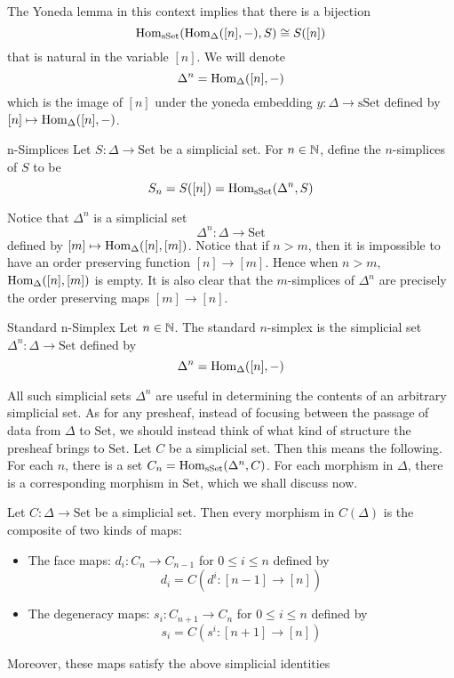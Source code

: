 \documentclass[a4paper]{article}
\begin{document}
The Yoneda lemma in this context implies that there is a bijection $$\operatorname{Hom}_{\text{sSet}}(\operatorname{Hom}_\Delta([n],-),S)\cong S([n])$$ that is natural in the variable $[n]$. We will denote $$\Delta^n=\operatorname{Hom}_\Delta([n],-)$$ which is the image of $[n]$ under the yoneda embedding $y:\Delta\to\text{sSet}$ defined by $[n]\mapsto\operatorname{Hom}_\Delta([n],-)$. 

\begin{defn}{n-Simplices}{} Let $S:\Delta\to\text{Set}$ be a simplicial set. For $n\in\mathbb{N}$, define the $n$-simplices of $S$ to be $$S_n=S([n])=\operatorname{Hom}_\text{sSet}(\Delta^n,S)$$
\end{defn}

Notice that $\Delta^n$ is a simplicial set $$\Delta^n:\Delta\to\text{Set}$$ defined by $[m]\mapsto\operatorname{Hom}_\Delta([n],[m])$. Notice that if $n>m$, then it is impossible to have an order preserving function $[n]\to[m]$. Hence when $n>m$, $\operatorname{Hom}_\Delta([n],[m])$ is empty. It is also clear that the $m$-simplices of $\Delta^n$ are precisely the order preserving maps $[m]\to[n]$. 

\begin{defn}{Standard n-Simplex}{} Let $n\in\mathbb{N}$. The standard $n$-simplex is the simplicial set $\Delta^n:\Delta\to\text{Set}$ defined by $$\Delta^n=\operatorname{Hom}_\Delta([n],-)$$
\end{defn}

All such simplicial sets $\Delta^n$ are useful in determining the contents of an arbitrary simplicial set. As for any presheaf, instead of focusing between the passage of data from $\Delta$ to $\text{Set}$, we should instead think of what kind of structure the presheaf brings to $\text{Set}$. Let $C$ be a simplicial set. Then this means the following. For each $n$, there is a set $C_n=\operatorname{Hom}_\text{sSet}(\Delta^n,C)$. For each morphism in $\Delta$, there is a corresponding morphism in $\text{Set}$, which we shall discuss now. 

\begin{thm}{}{} Let $C:\Delta\to\text{Set}$ be a simplicial set. Then every morphism in $C(\Delta)$ is the composite of two kinds of maps: 
\begin{itemize}
\item The face maps: $d_i:C_n\to C_{n-1}$ for $0\leq i\leq n$ defined by $$d_i=C(d^i:[n-1]\to[n])$$
\item The degeneracy maps: $s_i:C_{n+1}\to C_n$ for $0\leq i\leq n$ defined by $$s_i=C(s^i:[n+1]\to[n])$$
\end{itemize}
Moreover, these maps satisfy the above simplicial identities
\end{thm}
\end{document}
